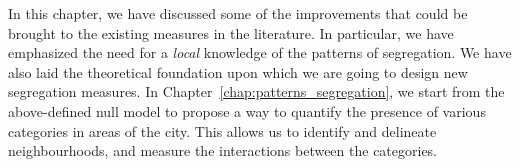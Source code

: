 \bigskip

In this chapter, we have discussed some of the improvements that could be
brought to the existing measures in the literature. In particular, we have
emphasized the need for a \emph{local} knowledge of the patterns of segregation.
We have also laid the theoretical foundation upon which we are going to design
new segregation measures.
In Chapter~\ref{chap:patterns_segregation}, we start from the above-defined null
model to propose a way to quantify the presence of various categories in areas
of the city. This allows us to identify and delineate neighbourhoods, and measure the interactions
between the categories. 
